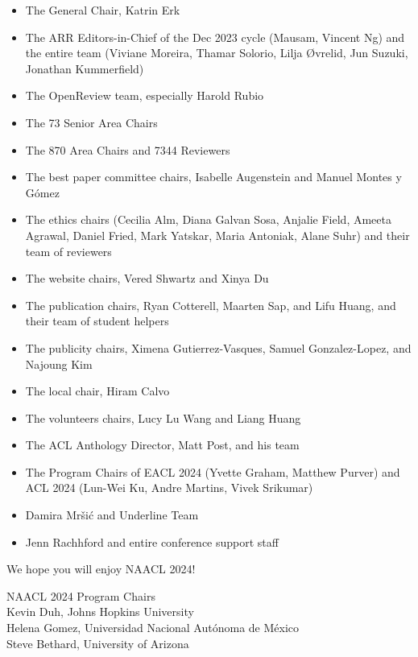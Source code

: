 \begin{itemize}
\setlength\parskip{0em}
\setlength\itemsep{0.3em}
\item The General Chair, Katrin Erk
\item The ARR Editors-in-Chief of the Dec 2023 cycle (Mausam, Vincent Ng) and the entire team (Viviane Moreira, Thamar Solorio, Lilja {\O}vrelid, Jun Suzuki, Jonathan Kummerfield)
\item The OpenReview team, especially Harold Rubio 
\item The 73 Senior Area Chairs
\item The 870 Area Chairs and 7344 Reviewers 
\item The best paper committee chairs, Isabelle Augenstein and Manuel Montes y G\'omez
\item The ethics chairs (Cecilia Alm, Diana Galvan Sosa, Anjalie Field, Ameeta Agrawal, Daniel Fried, Mark Yatskar, Maria Antoniak, Alane Suhr) and their team of reviewers
\item The website chairs, Vered Shwartz and Xinya Du
\item The publication chairs, Ryan Cotterell, Maarten Sap, and Lifu Huang, and their team of student helpers
\item The publicity chairs, Ximena Gutierrez-Vasques, Samuel Gonzalez-Lopez, and Najoung Kim
\item The local chair, Hiram Calvo
\item The volunteers chairs, Lucy Lu Wang and Liang Huang
\item The ACL Anthology Director, Matt Post, and his team
\item The Program Chairs of EACL 2024 (Yvette Graham, Matthew Purver) and ACL 2024 (Lun-Wei Ku, Andre Martins, Vivek Srikumar)
\item Damira Mr\v{s}i\'{c} and Underline Team
\item Jenn Rachhford and entire conference support staff
\end{itemize}

We hope you will enjoy NAACL 2024!

\noindent NAACL 2024 Program Chairs \\
Kevin Duh, Johns Hopkins University \\
Helena Gomez, Universidad Nacional Aut\'onoma de M\'exico \\
Steve Bethard, University of Arizona